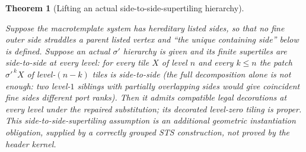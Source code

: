 \documentclass[11pt,a4paper]{article}
\newtheorem{theorem}[definition]{Theorem}
\theoremstyle{remark}
\newcommand{\lean}[1]{}
\newcommand{\uses}[1]{}
\begin{document}
\begin{theorem}[Lifting an actual side-to-side-supertiling hierarchy]
\label{lem:lift-hierarchy}
\lean{Tilings.Planned.lift_hierarchy}
\uses{def:certificate,def:hereditary,def:hierarchy,def:control/origin,def:control/substitution}
Suppose the macrotemplate system has hereditary listed sides, so that no
fine outer side straddles a parent listed vertex and ``the unique
containing side'' below is defined. Suppose an actual $\sigma'$ hierarchy
is given and its finite supertiles
are side-to-side at every level: for every tile $X$ of level $n$ and every
$k\le n$ the patch $\sigma'^{\,k}X$ of level-$(n-k)$ tiles is side-to-side
(the full decomposition alone is not enough: two level-$1$ siblings with
partially overlapping sides would give coincident fine sides different port
ranks). Then it admits compatible legal decorations at every
level under the repaired substitution; its decorated level-zero tiling
is proper. This side-to-side-supertiling assumption is an additional
geometric instantiation obligation, supplied by a correctly grouped STS
construction, not proved by the header kernel.
\end{theorem}
\end{document}
